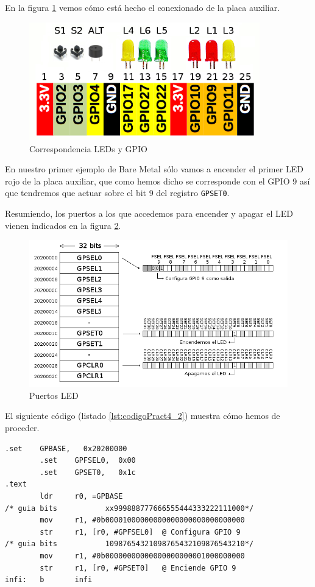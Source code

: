 En la figura \ref{fig:pinoutpeque} vemos cómo está hecho el conexionado de la placa auxiliar.

\begin{figure}[h]
  \centering
    \includegraphics[width=10cm]{graphs/RaspberryGPIOaux.png}
  \caption{Correspondencia LEDs y GPIO}
  \label{fig:pinoutpeque}
\end{figure}


En nuestro primer ejemplo de Bare Metal sólo vamos a encender el primer LED rojo
de la placa auxiliar, que como hemos dicho se corresponde con el GPIO 9 así que
tendremos que actuar sobre el bit 9 del registro {\tt GPSET0}.

Resumiendo, los puertos a los que accedemos para encender y apagar el LED
vienen indicados en la figura \ref{fig:gpio1}.

\begin{figure}[h]
  \centering
    \includegraphics[width=14cm]{graphs/gpio1.png}
  \caption{Puertos LED}
  \label{fig:gpio1}
\end{figure}

El siguiente código (listado \ref{lst:codigoPract4_2}) muestra cómo hemos de proceder.

\begin{lstlisting}[caption={esbn2.s},label={lst:codigoPract4_2}]
        .set    GPBASE,   0x20200000
        .set    GPFSEL0,  0x00
        .set    GPSET0,   0x1c
.text
        ldr     r0, =GPBASE
/* guia bits           xx999888777666555444333222111000*/
        mov     r1, #0b00001000000000000000000000000000
        str     r1, [r0, #GPFSEL0]  @ Configura GPIO 9
/* guia bits           10987654321098765432109876543210*/
        mov     r1, #0b00000000000000000000001000000000
        str     r1, [r0, #GPSET0]   @ Enciende GPIO 9
infi:   b       infi
\end{lstlisting}


